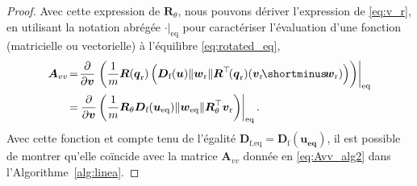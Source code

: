 \begin{proof}
Avec cette expression de $ \boldsymbol{R}_\theta$, nous pouvons dériver l'expression de \eqref{eq:v_r}, en utilisant la notation abrégée $\left. \cdot \right|_{\text{eq}}$ pour caractériser l'évaluation d'une fonction (matricielle ou vectorielle) à l'équilibre \eqref{eq:rotated_eq},
\begin{align}
\nonumber
\boldsymbol{A}_{vv} &\!=\! \frac{\partial }{\partial \boldsymbol{v}}  \left. \left( \frac{1}{m} \boldsymbol{R}(\boldsymbol{q}_{\text{r}}) \left( %
\boldsymbol{D}_{\text{f}}(\boldsymbol{u}) \lVert \boldsymbol{w}_{\text{r}} \rVert \boldsymbol{R}^\top \!(\boldsymbol{q}_{\mathrm{r}}) ( \boldsymbol{v}_{\mathrm{r}} \! \shortminus \! \boldsymbol{w}_{\text{r}})  \right) \right)\right|_{\text{eq}}\\
&\!=\!  \left. \frac{\partial }{\partial \boldsymbol{v}} \left( \frac{1}{m}  \boldsymbol{R}_\theta  \boldsymbol{D}_{\text{f}}(\boldsymbol{u_{\text{eq}}}) \lVert \boldsymbol{w}_{\mathrm{eq}} \rVert   \boldsymbol{R}_\theta^\top  \boldsymbol{v}_{\mathrm{r}} \right) \right|_{\text{eq}}.
\label{eq:Avv_derivation}
\end{align} 
Avec cette fonction et compte tenu de l'égalité $\boldsymbol{D}_{\text{f,eq}} = \boldsymbol{D}_{\text{f}}(\boldsymbol{u_{\text{eq}}})$, il est possible de montrer qu'elle coïncide avec la matrice
$\boldsymbol{A}_{vv}$ donnée en \eqref{eq:Avv_alg2} dans l'Algorithme~\ref{alg:linea}.


\end{proof}
